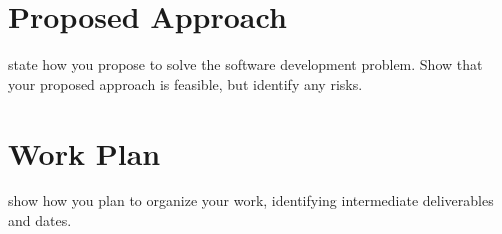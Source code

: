 \documentclass{mprop}
\begin{document}
\section{Proposed Approach}

state how you propose to solve the software development problem. Show that your proposed approach is feasible, but identify any risks.

\section{Work Plan}

show how you plan to organize your work, identifying intermediate deliverables and dates.



\end{document}
